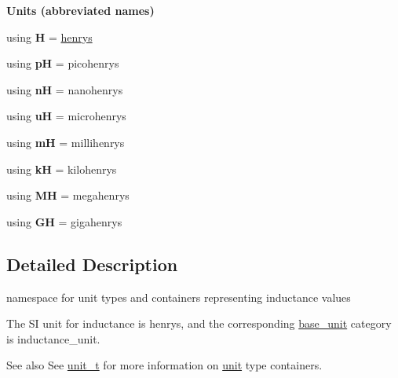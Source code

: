\begin{Indent}{\bf Units (abbreviated names)}\par
\begin{DoxyCompactItemize}
\item 
\hypertarget{namespaceunits_1_1inductance_a526c7067975cee5bec2fffe4b7a1bf24}{}using {\bfseries H} = \hyperlink{structunits_1_1unit}{henrys}\label{namespaceunits_1_1inductance_a526c7067975cee5bec2fffe4b7a1bf24}

\item 
\hypertarget{namespaceunits_1_1inductance_a5402f20b9dc7cbd03026ba6d4b858632}{}using {\bfseries p\+H} = picohenrys\label{namespaceunits_1_1inductance_a5402f20b9dc7cbd03026ba6d4b858632}

\item 
\hypertarget{namespaceunits_1_1inductance_a4a1da4408105e7d69c78d2d3f4d16d13}{}using {\bfseries n\+H} = nanohenrys\label{namespaceunits_1_1inductance_a4a1da4408105e7d69c78d2d3f4d16d13}

\item 
\hypertarget{namespaceunits_1_1inductance_a31c0e15cc60a9f6c04069390a4cead70}{}using {\bfseries u\+H} = microhenrys\label{namespaceunits_1_1inductance_a31c0e15cc60a9f6c04069390a4cead70}

\item 
\hypertarget{namespaceunits_1_1inductance_ae587b24965bc126fe061d6fe84c61ddc}{}using {\bfseries m\+H} = millihenrys\label{namespaceunits_1_1inductance_ae587b24965bc126fe061d6fe84c61ddc}

\item 
\hypertarget{namespaceunits_1_1inductance_a6191353cd65a0f0632f5d551e9887af4}{}using {\bfseries k\+H} = kilohenrys\label{namespaceunits_1_1inductance_a6191353cd65a0f0632f5d551e9887af4}

\item 
\hypertarget{namespaceunits_1_1inductance_aeb735f23fa49a3c387fc0fa8bdbf937a}{}using {\bfseries M\+H} = megahenrys\label{namespaceunits_1_1inductance_aeb735f23fa49a3c387fc0fa8bdbf937a}

\item 
\hypertarget{namespaceunits_1_1inductance_a655efa7567f075b5f32e3a4ebfe8b626}{}using {\bfseries G\+H} = gigahenrys\label{namespaceunits_1_1inductance_a655efa7567f075b5f32e3a4ebfe8b626}

\end{DoxyCompactItemize}
\end{Indent}


\subsection{Detailed Description}
namespace for unit types and containers representing inductance values 

The S\+I unit for inductance is {\ttfamily henrys}, and the corresponding {\ttfamily \hyperlink{structunits_1_1base__unit}{base\+\_\+unit}} category is {\ttfamily inductance\+\_\+unit}. \begin{DoxySeeAlso}{See also}
See \hyperlink{classunits_1_1unit__t}{unit\+\_\+t} for more information on \hyperlink{structunits_1_1unit}{unit} type containers. 
\end{DoxySeeAlso}

